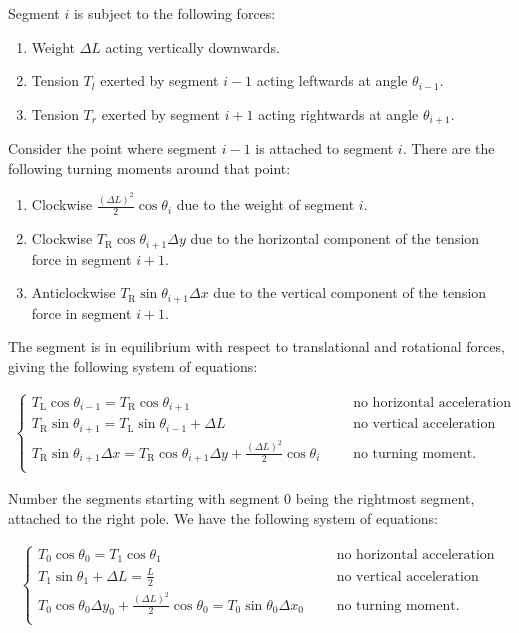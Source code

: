 \documentclass[12pt]{article}
\newcommand{\Tl}{T_{\text{L}}}
\newcommand{\Tr}{T_{\text{R}}}
\begin{document}
Segment $i$ is subject to the following forces:
\begin{enumerate}
\item Weight $\Delta L$ acting vertically downwards.
\item Tension $T_l$ exerted by segment $i-1$ acting leftwards at angle $\theta_{i-1}$.
\item Tension $T_r$ exerted by segment $i+1$ acting rightwards at angle $\theta_{i+1}$.
\end{enumerate}
Consider the point where segment $i-1$ is attached to segment $i$. There are the following turning
moments around that point:
\begin{enumerate}
\item Clockwise $\frac{(\Delta L)^2}{2}\cos\theta_i$ due to the weight of segment $i$.
\item Clockwise $\Tr\cos\theta_{i+1}\Delta y$ due to the horizontal component of the tension force
  in segment $i+1$.
\item Anticlockwise $\Tr\sin\theta_{i+1}\Delta x$ due to the vertical component of the tension
  force in segment $i+1$.
\end{enumerate}

The segment is in equilibrium with respect to translational and rotational forces, giving the
following system of equations:

\begin{align*}
  \begin{cases}
    \Tl\cos\theta_{i-1} = \Tr\cos\theta_{i+1} ~~~~~~~&\text{no horizontal acceleration}\\
    \Tr\sin\theta_{i+1} = \Tl\sin\theta_{i-1} + \Delta L ~~~~~~~&\text{no vertical acceleration}\\
    \Tr\sin\theta_{i+1}\Delta x = \Tr\cos\theta_{i+1}\Delta y + \frac{(\Delta L)^2}{2}\cos\theta_i ~~~~~~~&\text{no turning moment.}\\
  \end{cases}
\end{align*}

\newpage

Number the segments starting with segment 0 being the rightmost segment, attached to the right
pole. We have the following system of equations:

\begin{align*}
  \begin{cases}
    T_0\cos\theta_0 = T_1\cos\theta_1                               ~~~~~~~&\text{no horizontal acceleration}\\
    T_1\sin\theta_1 + \Delta L = \frac{L}{2}                        ~~~~~~~&\text{no vertical acceleration}\\
    T_0\cos\theta_0\Delta y_0 +
    \frac{(\Delta L)^2}{2} \cos\theta_0 = T_0\sin\theta_0 \Delta x_0 ~~~~~~~&\text{no turning moment.}\\
  \end{cases}
\end{align*}
\end{document}
